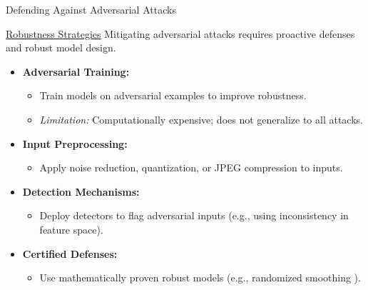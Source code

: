 \documentclass[pdfpagelabels=false, usepdftitle=false, aspectratio=169]{beamer}
\begin{document}
\begin{frame}{Defending Against Adversarial Attacks}
\scriptsize
\begin{block}{\href{https://arxiv.org/abs/1902.06705}{Robustness Strategies}}
    Mitigating adversarial attacks requires proactive defenses and robust model design.
\end{block}
\begin{itemize}
    \item \textbf{Adversarial Training:} 
    \begin{itemize}
        \item Train models on adversarial examples to improve robustness.
        \item \textit{Limitation:} Computationally expensive; does not generalize to all attacks.
    \end{itemize}
    \item \textbf{Input Preprocessing:} 
    \begin{itemize}
        \item Apply noise reduction, quantization, or JPEG compression to inputs.
    \end{itemize}
    \item \textbf{Detection Mechanisms:} 
    \begin{itemize}
        \item Deploy detectors to flag adversarial inputs (e.g., using inconsistency in feature space).
    \end{itemize}
    \item \textbf{Certified Defenses:} 
    \begin{itemize}
        \item Use mathematically proven robust models (e.g., randomized smoothing ).
    \end{itemize}
\end{itemize}
\end{frame}

\end{document}
